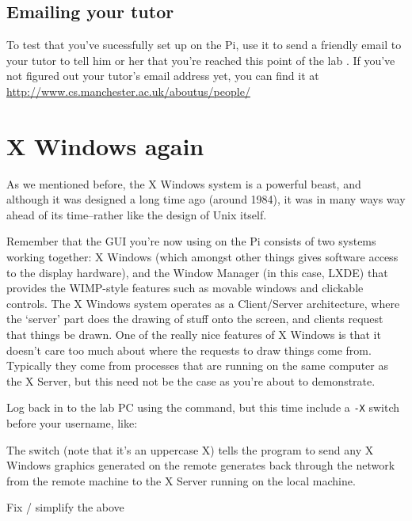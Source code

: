 \subsection{Emailing your tutor}

To test that you've sucessfully set  up on the Pi, use it to send a friendly email to your tutor to tell him or her that you're reached this point of the lab . If you've not figured out your tutor's email address yet, you can find it at
\\
\url{http://www.cs.manchester.ac.uk/aboutus/people/}

\section{X Windows again}

As we mentioned before, the X Windows system is a powerful beast, and although it was designed a long time ago (around 1984), it was in many ways way ahead of its time--rather like the design of Unix itself.

Remember that the GUI you're now using on the Pi consists of two systems working together: X Windows (which amongst other things gives software access to the display hardware), and the Window Manager (in this case, LXDE) that provides the WIMP-style features such as movable windows and clickable controls. The X Windows system operates as a Client/Server architecture, where the `server' part does the drawing of stuff onto the screen, and clients request that things be drawn. One of the really nice features of X Windows is that it doesn't care too much about where the requests to draw things come from. Typically they come from processes that are running on the same computer as the X Server, but this need not be the case as you're about to demonstrate.

Log back in to the lab PC using the  command, but this time include a \texttt{-X} switch before your username, like:


The  switch (note that it's an uppercase X) tells the  program to send any X Windows graphics generated on the remote generates back through the network from the remote machine to the X Server running on the local machine.

\begin{note}
Fix / simplify the above
\end{note}

